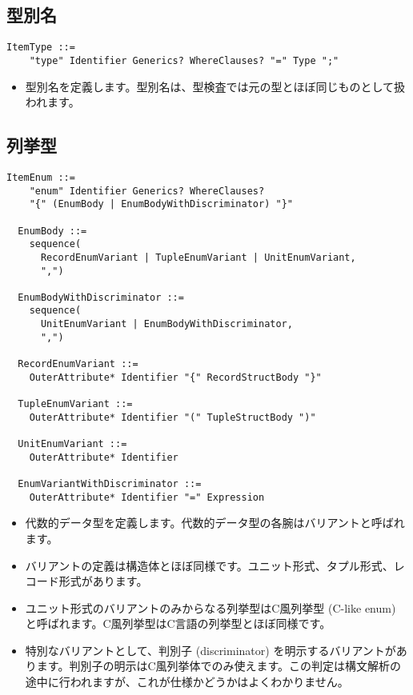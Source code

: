 \documentclass[dvipdfmx,uplatex,papersize,a4paper,10pt]{jsbook}
\theoremstyle{definition}
\begin{document}
\subsection{型別名}

\begin{lstlisting}[language=BNFLike, gobble=2]
  ItemType ::=
    "type" Identifier Generics? WhereClauses? "=" Type ";"
\end{lstlisting}

\begin{itemize}
  \item 型別名を定義します。型別名は、型検査では元の型とほぼ同じものとして扱われます。
\end{itemize}

\subsection{列挙型}

\begin{lstlisting}[language=BNFLike, gobble=2]
  ItemEnum ::=
    "enum" Identifier Generics? WhereClauses?
    "{" (EnumBody | EnumBodyWithDiscriminator) "}"

  EnumBody ::=
    sequence(
      RecordEnumVariant | TupleEnumVariant | UnitEnumVariant,
      ",")

  EnumBodyWithDiscriminator ::=
    sequence(
      UnitEnumVariant | EnumBodyWithDiscriminator,
      ",")

  RecordEnumVariant ::=
    OuterAttribute* Identifier "{" RecordStructBody "}"

  TupleEnumVariant ::=
    OuterAttribute* Identifier "(" TupleStructBody ")"

  UnitEnumVariant ::=
    OuterAttribute* Identifier

  EnumVariantWithDiscriminator ::=
    OuterAttribute* Identifier "=" Expression
\end{lstlisting}

\begin{itemize}
  \item 代数的データ型を定義します。代数的データ型の各腕はバリアントと呼ばれます。
  \item バリアントの定義は構造体とほぼ同様です。ユニット形式、タプル形式、レコード形式があります。
  \item ユニット形式のバリアントのみからなる列挙型はC風列挙型 (C-like enum) と呼ばれます。C風列挙型はC言語の列挙型とほぼ同様です。
  \item 特別なバリアントとして、判別子 (discriminator) を明示するバリアントがあります。判別子の明示はC風列挙体でのみ使えます。この判定は構文解析の途中に行われますが、これが仕様かどうかはよくわかりません。
\end{itemize}
\end{document}
